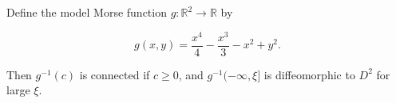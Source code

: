 Define the model Morse function $g: \mathbb{R}^2 \to \mathbb{R}$ by

$$g(x,y) = \frac{x^4}{4} - \frac{x^3}{3} - x^2 + y^2.$$

Then $g^{-1}(c)$ is connected if $c \geqslant 0$, and $g^{-1}(-\infty, \xi]$ is diffeomorphic to $D^2$ for large $\xi$.

